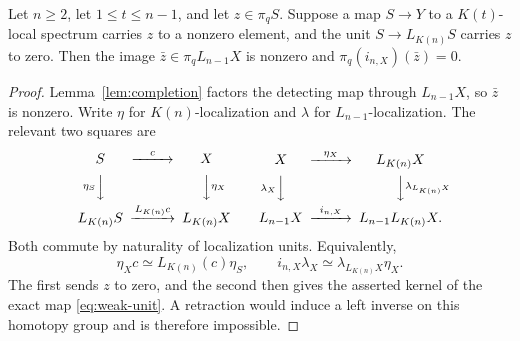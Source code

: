 \begin{proposition}\label{prop:kernel-criterion}
Let $n\geq2$, let $1\leq t\leq n-1$, and let $z\in\pi_qS$.
Suppose a map $S\to Y$ to a $K(t)$-local spectrum carries $z$ to a
nonzero element, and the unit $S\to L_{K(n)}S$ carries $z$ to zero.
Then the image $\bar z\in\pi_qL_{n-1}X$ is nonzero and
$\pi_q(i_{n,X})(\bar z)=0$.
\end{proposition}
\begin{proof}
Lemma~\ref{lem:completion} factors the detecting map through
$L_{n-1}X$, so $\bar z$ is nonzero. Write $\eta$ for $K(n)$-localization
and $\lambda$ for $L_{n-1}$-localization. The relevant two squares are
\[
\begin{CD}
 S @>{c}>> X\\
 @V{\eta_S}VV @VV{\eta_X}V\\
 L_{K(n)}S @>{L_{K(n)}c}>> L_{K(n)}X
\end{CD}
\qquad
\begin{CD}
 X @>{\eta_X}>> L_{K(n)}X\\
 @V{\lambda_X}VV @VV{\lambda_{L_{K(n)}X}}V\\
 L_{n-1}X @>{i_{n,X}}>> L_{n-1}L_{K(n)}X.
\end{CD}
\]
Both commute by naturality of localization units. Equivalently,
\[
 \eta_Xc\simeq L_{K(n)}(c)\eta_S,
 \qquad i_{n,X}\lambda_X\simeq\lambda_{L_{K(n)}X}\eta_X.
\]
The first sends $z$ to zero, and the second then gives the asserted
kernel of the exact map \eqref{eq:weak-unit}. A retraction would induce
a left inverse on this homotopy group and is therefore impossible.
\end{proof}
